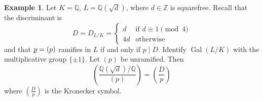 \documentclass[11pt]{article}
\theoremstyle{definition}
\newtheorem{example}[definition]{Example}
\theoremstyle{plain}
\theoremstyle{remark}
\DeclareMathOperator{\Gal}{Gal}
\newcommand{\ZZ}{\mathbb{Z}}
\newcommand{\QQ}{\mathbb{Q}}
\newcommand{\up}{{\underline{\smash{p}}}}
\newcommand{\leg}[2]{\left(\frac{#1}{#2}\right)}
\begin{document}
\begin{example}\label{eg:1_10}
    Let $K = \QQ$, $L = \QQ(\sqrt{d})$, where $d \in \ZZ$ is squarefree. Recall that the discriminant is
    \begin{equation*}
        D = D_{L/K} =
        \begin{cases}
            d &\text{if } d \equiv 1 \pmod{4}\\
            4d &\text{otherwise}
        \end{cases}
    \end{equation*}
    and that $\up = (p)$ ramifies in $L$ if and only if $p \mid D$. Identify $\Gal(L/K)$ with the multiplicative group $\{\pm 1\}$. Let $(p)$ be unramified. Then
    \begin{equation*}
        \leg{\QQ(\sqrt{d}) / \QQ}{(p)} = \leg{D}{p}
    \end{equation*}
    where $\leg{D}{p}$ is the Kronecker symbol.
\end{example}
\end{document}
